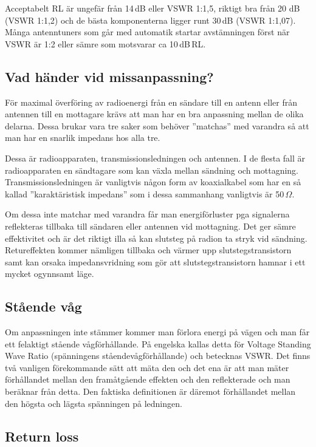Acceptabelt RL är ungefär från 14\,dB eller VSWR 1:1,5, riktigt bra från 20 dB
(VSWR 1:1,2) och de bästa komponenterna ligger runt 30\,dB (VSWR
1:1,07). Många antenntuners som går med automatik startar avstämningen först
när VSWR är 1:2 eller sämre som motsvarar ca 10\,dB\,RL.


\subsection{Vad händer vid missanpassning?}

För maximal överföring av radioenergi från en sändare till en antenn eller
från antennen till en mottagare krävs att man har en bra anpassning mellan de
olika delarna. Dessa brukar vara tre saker som behöver ''matchas'' med
varandra så att man har en snarlik impedans hos alla tre.

Dessa är radioapparaten, transmissionsledningen och antennen. I de flesta fall
är radioapparaten en sändtagare som kan växla mellan sändning och mottagning.
Transmissionsledningen är vanligtvis någon form av koaxialkabel som har en så
kallad ''karaktäristisk impedans'' som i dessa sammanhang vanligtvis är
50\,$\Omega$.

Om dessa inte matchar med varandra får man energiförluster pga signalerna
reflekteras tillbaka till sändaren eller antennen vid mottagning. Det ger
sämre effektivitet och är det riktigt illa så kan slutsteg på radion ta stryk
vid sändning. Retureffekten kommer nämligen tillbaka och värmer upp
slutstegstransistorn samt kan orsaka impedansvridning som gör att
slutstegstransistorn hamnar i ett mycket ogynnsamt läge.

\subsection{Stående våg}

Om anpassningen inte stämmer kommer man förlora energi på vägen och man får
ett felaktigt stående vågförhållande. På engelska kallas detta för Voltage
Standing Wave Ratio (spänningens ståendevågförhållande) och betecknas VSWR.
Det finns två vanligen förekommande sätt att mäta den och det ena är att man
mäter förhållandet mellan den framåtgående effekten och den reflekterade och
man beräknar från detta. Den faktiska definitionen är däremot förhållandet mellan
den högsta och lägsta spänningen på ledningen.

\subsection{Return loss}

